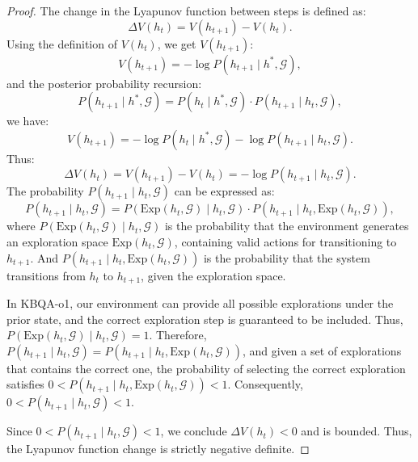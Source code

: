 \documentclass{article}
\theoremstyle{plain}
\theoremstyle{definition}
\theoremstyle{remark}
\begin{document}
\begin{proof}
The change in the Lyapunov function between steps is defined as:
\begin{equation}
\Delta V(h_t) = V(h_{t+1}) - V(h_t).
\end{equation}
Using the definition of $V(h_t)$, we get $V(h_{t+1})$:
\begin{equation}
V(h_{t+1}) = -\log P(h_{t+1} \mid h^*, \mathcal{G}),
\end{equation}
and the posterior probability recursion:
\begin{equation}
P(h_{t+1} \mid h^*, \mathcal{G}) = P(h_t \mid h^*, \mathcal{G}) \cdot P(h_{t+1} \mid h_t, \mathcal{G}),
\end{equation}
we have:
\begin{equation}
V(h_{t+1}) = -\log P(h_t \mid h^*, \mathcal{G}) - \log P(h_{t+1} \mid h_t, \mathcal{G}).
\end{equation}
Thus:
\begin{equation}
\Delta V(h_t) = V(h_{t+1}) - V(h_t) = -\log P(h_{t+1} \mid h_t, \mathcal{G}).
\end{equation}
The probability $P(h_{t+1} \mid h_t, \mathcal{G})$ can be expressed as:
\begin{equation}
P(h_{t+1} \mid h_t, \mathcal{G}) = P(\text{Exp}(h_t, \mathcal{G}) \mid h_t, \mathcal{G}) \cdot P(h_{t+1} \mid h_t, \text{Exp}(h_t, \mathcal{G})),
\end{equation}
where $P(\text{Exp}(h_t, \mathcal{G}) \mid h_t, \mathcal{G})$ is the probability that the environment generates an exploration space $\text{Exp}(h_t, \mathcal{G})$, containing valid actions for transitioning to $h_{t+1}$. And $P(h_{t+1} \mid h_t, \text{Exp}(h_t, \mathcal{G}))$ is the probability that the system transitions from $h_t$ to $h_{t+1}$, given the exploration space.

In KBQA-o1, our environment can provide all possible explorations under the prior state, and the correct exploration step is guaranteed to be included. Thus, $P(\text{Exp}(h_t, \mathcal{G}) \mid h_t, \mathcal{G}) = 1$. Therefore, $P(h_{t+1} \mid h_t, \mathcal{G}) = P(h_{t+1} \mid h_t, \text{Exp}(h_t, \mathcal{G}))$, and given a set of explorations that contains the correct one, the probability of selecting the correct exploration satisfies $0 < P(h_{t+1} \mid h_t, \text{Exp}(h_t, \mathcal{G})) < 1$. Consequently, $0 < P(h_{t+1} \mid h_t, \mathcal{G}) < 1$.

Since $0 < P(h_{t+1} \mid h_t, \mathcal{G}) < 1$, we conclude $\Delta V(h_t) < 0$ and is bounded. Thus, the Lyapunov function change is strictly negative definite.


\end{proof}
\end{document}
